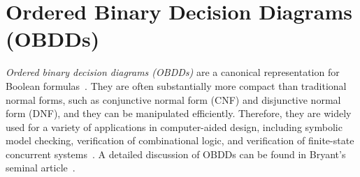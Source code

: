 \section{Ordered Binary Decision Diagrams (OBDDs)}
\label{sec:OBDDs}

{\it Ordered binary decision diagrams (OBDDs)}  are a canonical 
representation for Boolean formulas~\cite{Bryant:BDD}. They are often
substantially more compact than traditional normal forms, such as
conjunctive normal form (CNF) and disjunctive normal form (DNF), and
they can be manipulated efficiently. Therefore, they are widely used for a
variety of applications in computer-aided design, including symbolic
model checking, verification of combinational logic, and verification of
finite-state concurrent systems~\cite{Clarke:book}.  A detailed
discussion of OBDDs can be found in Bryant's seminal
article~\cite{Bryant:BDD}.


